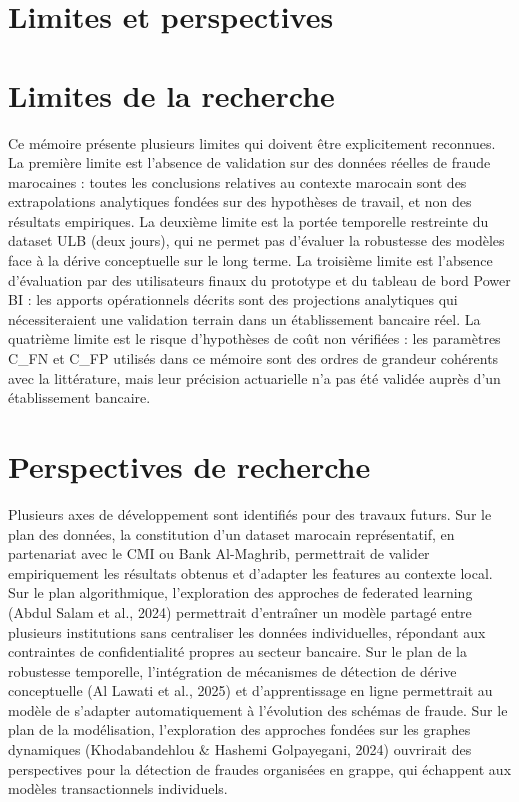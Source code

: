 \section{Limites et perspectives}

\section{Limites de la recherche}

Ce mémoire présente plusieurs limites qui doivent être explicitement reconnues. La première limite est l'absence de validation sur des données réelles de fraude marocaines : toutes les conclusions relatives au contexte marocain sont des extrapolations analytiques fondées sur des hypothèses de travail, et non des résultats empiriques. La deuxième limite est la portée temporelle restreinte du dataset ULB (deux jours), qui ne permet pas d'évaluer la robustesse des modèles face à la dérive conceptuelle sur le long terme. La troisième limite est l'absence d'évaluation par des utilisateurs finaux du prototype et du tableau de bord Power BI : les apports opérationnels décrits sont des projections analytiques qui nécessiteraient une validation terrain dans un établissement bancaire réel. La quatrième limite est le risque d'hypothèses de coût non vérifiées : les paramètres C\_FN et C\_FP utilisés dans ce mémoire sont des ordres de grandeur cohérents avec la littérature, mais leur précision actuarielle n'a pas été validée auprès d'un établissement bancaire.

\section{Perspectives de recherche}

Plusieurs axes de développement sont identifiés pour des travaux futurs. Sur le plan des données, la constitution d'un dataset marocain représentatif, en partenariat avec le CMI ou Bank Al-Maghrib, permettrait de valider empiriquement les résultats obtenus et d'adapter les features au contexte local. Sur le plan algorithmique, l'exploration des approches de federated learning (Abdul Salam et al., 2024) permettrait d'entraîner un modèle partagé entre plusieurs institutions sans centraliser les données individuelles, répondant aux contraintes de confidentialité propres au secteur bancaire. Sur le plan de la robustesse temporelle, l'intégration de mécanismes de détection de dérive conceptuelle (Al Lawati et al., 2025) et d'apprentissage en ligne permettrait au modèle de s'adapter automatiquement à l'évolution des schémas de fraude. Sur le plan de la modélisation, l'exploration des approches fondées sur les graphes dynamiques (Khodabandehlou \& Hashemi Golpayegani, 2024) ouvrirait des perspectives pour la détection de fraudes organisées en grappe, qui échappent aux modèles transactionnels individuels.

